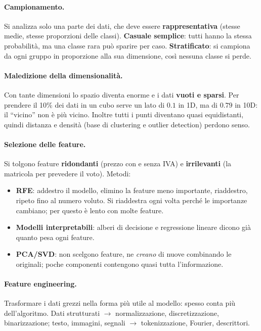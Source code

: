 \paragraph*{Campionamento.} Si analizza solo una parte dei dati, che deve essere \textbf{rappresentativa} (stesse medie, stesse proporzioni delle classi).
\textbf{Casuale semplice}: tutti hanno la stessa probabilità, ma una classe rara può sparire per caso.
\textbf{Stratificato}: si campiona da ogni gruppo in proporzione alla sua dimensione, così nessuna classe si perde.

\paragraph*{Maledizione della dimensionalità.} Con tante dimensioni lo spazio diventa enorme e i dati \textbf{vuoti e sparsi}. Per prendere il 10\% dei dati in un cubo serve un lato di $0.1$ in 1D, ma di $0.79$ in 10D: il ``vicino'' non è più vicino. Inoltre tutti i punti diventano quasi equidistanti, quindi distanza e densità (base di clustering e outlier detection) perdono senso.

\paragraph*{Selezione delle feature.} Si tolgono feature \textbf{ridondanti} (prezzo con e senza IVA) e \textbf{irrilevanti} (la matricola per prevedere il voto). Metodi:
\begin{itemize}
    \item \textbf{RFE}: addestro il modello, elimino la feature meno importante, riaddestro, ripeto fino al numero voluto. Si riaddestra ogni volta perché le importanze cambiano; per questo è lento con molte feature.
    \item \textbf{Modelli interpretabili}: alberi di decisione e regressione lineare dicono già quanto pesa ogni feature.
    \item \textbf{PCA/SVD}: non scelgono feature, ne \emph{creano} di nuove combinando le originali; poche componenti contengono quasi tutta l'informazione.
\end{itemize}

\paragraph*{Feature engineering.} Trasformare i dati grezzi nella forma più utile al modello: spesso conta più dell'algoritmo. Dati strutturati $\to$ normalizzazione, discretizzazione, binarizzazione; testo, immagini, segnali $\to$ tokenizzazione, Fourier, descrittori.

